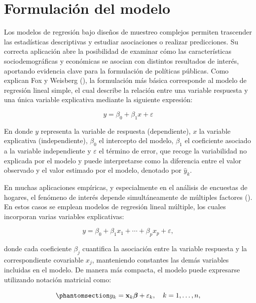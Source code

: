 \documentclass[
  spanish,
  11pt,
  letterpaper,
  oneside,
  open=any]{scrbook}
\begin{document}
\section{Formulación del modelo}\label{formulacion-del-modelo}

Los modelos de regresión bajo diseños de muestreo complejos permiten
trascender las estadísticas descriptivas y estudiar asociaciones o
realizar predicciones. Su correcta aplicación abre la posibilidad de
examinar cómo las características sociodemográficas y económicas se
asocian con distintos resultados de interés, aportando evidencia clave
para la formulación de políticas públicas. Como explican Fox y Weisberg
(), la formulación más básica
corresponde al modelo de regresión lineal simple, el cual describe la
relación entre una variable respuesta y una única variable explicativa
mediante la siguiente expresión:

\[
y = \beta_{0} + \beta_{1}x + \varepsilon
\]

En donde \(y\) representa la variable de respuesta (dependiente), \(x\)
la variable explicativa (independiente), \(\beta_{0}\) el intercepto del
modelo, \(\beta_{1}\) el coeficiente asociado a la variable
independiente y \(\varepsilon\) el término de error, que recoge la
variabilidad no explicada por el modelo y puede interpretarse como la
diferencia entre el valor observado y el valor estimado por el modelo,
denotado por \(\hat{y}_k\).

En muchas aplicaciones empíricas, y especialmente en el análisis de
encuestas de hogares, el fenómeno de interés depende simultáneamente de
múltiples factores (). En estos casos se emplean modelos de regresión lineal
múltiple, los cuales incorporan varias variables explicativas:

\[
y = \beta_{0} + \beta_{1}x_{1} + \cdots + \beta_{p}x_{p} + \varepsilon,
\]

donde cada coeficiente \(\beta_{j}\) cuantifica la asociación entre la
variable respuesta y la correspondiente covariable \(x_{j}\),
manteniendo constantes las demás variables incluidas en el modelo. De
manera más compacta, el modelo puede expresarse utilizando notación
matricial como:

\begin{equation}\protect\phantomsection\label{eq-regresion-lineal-matricial}{
y_{k} = \mathbf{x}_{k}\boldsymbol{\beta} + \varepsilon_{k}, \quad k=1,\ldots,n,
}\end{equation}
\end{document}
